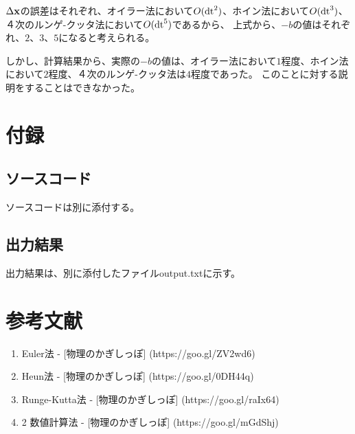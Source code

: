 \documentclass[11pt]{jsarticle}
\newcommand{\xb}{{\bf x}}
\newcommand{\dtn}{{\rm dt}}
\begin{document}
            $\Delta \xb$の誤差はそれぞれ、オイラー法において$O(\dtn^2)$、ホイン法において$O(\dtn^3)$、４次のルンゲ-クッタ法において$O(\dtn^5)$であるから、
            上式から、$-b$の値はそれぞれ、$2$、$3$、$5$になると考えられる。

            しかし、計算結果から、実際の$-b$の値は、オイラー法において$1$程度、ホイン法において$2$程度、４次のルンゲ-クッタ法は$4$程度であった。
            このことに対する説明をすることはできなかった。

    \section{付録}
        \subsection{ソースコード}
            ソースコードは別に添付する。

        \subsection{出力結果}
            出力結果は、別に添付したファイルoutput.txtに示す。

    \section{参考文献}
        \begin{enumerate}
            \item Euler法 - [物理のかぎしっぽ] (https://goo.gl/ZV2wd6)
            \item Heun法 - [物理のかぎしっぽ] (https://goo.gl/0DH44q)
            \item Runge-Kutta法 - [物理のかぎしっぽ] (https://goo.gl/raIx64)
            \item 2 数値計算法 - [物理のかぎしっぽ] (https://goo.gl/mGdShj)
        \end{enumerate}
\end{document}
